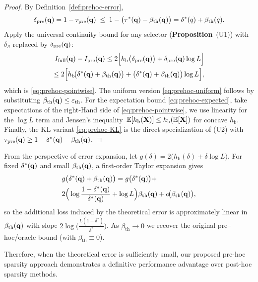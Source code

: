 \begin{proof}
By Definition~\ref{def:prehoc-error},
\[
\delta_{\mathrm{pre}}(\mathbf{q})=1-\tau_{\mathrm{pre}}(\mathbf{q})
\;\le\;
1-\big(\tau^{*}(\mathbf{q})-\beta_{\mathrm{th}}(\mathbf{q})\big)
=
\delta^{*}(q)+\beta_{\mathrm{th}}(q).
\]
Apply the universal continuity bound for any selector (\textbf{Proposition}~(U1)) with
$\delta_{\mathcal S}$ replaced by $\delta_{\mathrm{pre}}(\mathbf{q})$:
\begin{align}
    I_{\mathrm{full}}(\mathbf{q})-I_{\mathrm{pre}}(\mathbf{q})
\le
2\Big[h_{\mathrm b}\big(\delta_{\mathrm{pre}}(\mathbf{q})\big)
+\delta_{\mathrm{pre}}(\mathbf{q})\log L\Big] \nonumber \\
\le
2\Big[
h_{\mathrm b}\!\big(\delta^{*}(\mathbf{q})+\beta_{\mathrm{th}}(\mathbf{q})\big)
+\big(\delta^{*}(\mathbf{q})+\beta_{\mathrm{th}}(\mathbf{q})\big)\log L
\Big], \nonumber 
\end{align}
which is \eqref{eq:prehoc-pointwise}. The uniform version \eqref{eq:prehoc-uniform}
follows by substituting $\beta_{\mathrm{th}}(\mathbf{q})\le \varepsilon_{\mathrm{th}}$.
For the expectation bound \eqref{eq:prehoc-expected}, take expectations of the right‑Hand side of \eqref{eq:prehoc-pointwise}, we use linearity for the $\log L$ term and Jensen's inequality $\,\mathbb E[h_{\mathrm b}(\mathbf{X})]\le h_{\mathrm b}(\mathbb E[\mathbf{X}])$ for concave $h_{\mathrm b}$. Finally, the KL variant \eqref{eq:prehoc-KL} is the direct specialization of (U2) with
$\tau_{\mathrm{pre}}(\mathbf{q})\ge 1-\delta^{*}(\mathbf{q})-\beta_{\mathrm{th}}(\mathbf{q})$.
\end{proof}

From the perspective of error expansion, let $g(\delta)=2\big(h_{\mathrm b}(\delta)+\delta\log L\big)$.
For fixed $\delta^{*}(\mathbf{q})$ and small $\beta_{\mathrm{th}}(\mathbf{q})$,
a first-order Taylor expansion gives
\begin{align}
    & g\big(\delta^{*}(\mathbf{q})+\beta_{\mathrm{th}}(\mathbf{q})\big) = g\big(\delta^{*}(\mathbf{q})\big)
    + \nonumber \\
& 2\Big(\log\frac{1-\delta^{*}(\mathbf{q})}{\delta^{*}(\mathbf{q})}+\log L\Big)\beta_{\mathrm{th}}(\mathbf{q})
+ o\!\big(\beta_{\mathrm{th}}(\mathbf{q})\big), \nonumber
\end{align}
so the additional loss induced by the theoretical error is approximately linear in $\beta_{\mathrm{th}}(\mathbf{q})$ with slope
$2\log\!\big(\tfrac{L(1-\delta^{*})}{\delta^{*}}\big)$.
As $\beta_{\mathrm{th}}\!\to 0$ we recover the original pre--hoc/oracle bound
(with $\beta_{\mathrm{th}}\equiv 0$).

Therefore, when the theoretical error is sufficiently small, our proposed pre-hoc sparsity approach demonstrates a definitive performance advantage over post-hoc sparsity methods.

